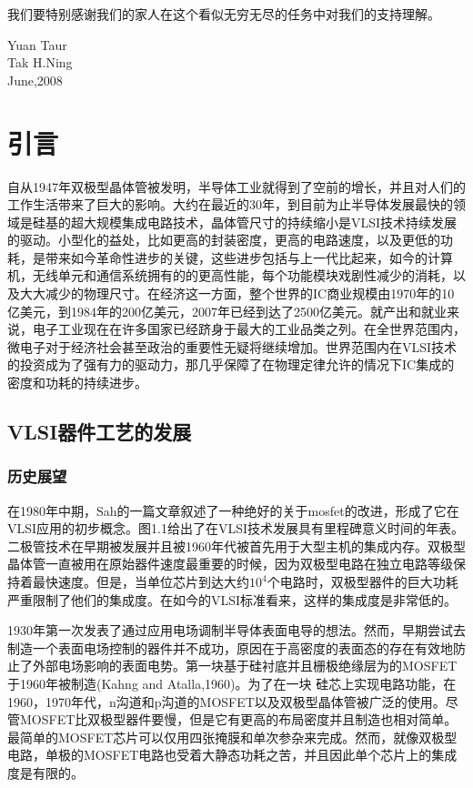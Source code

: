 \documentclass[cn,11pt,chinese]{elegantbook}
\begin{document}
我们要特别感谢我们的家人在这个看似无穷无尽的任务中对我们的支持理解。
\vskip 1.5cm

\begin{flushright}
	Yuan Taur\\
	Tak H.Ning\\
    June,2008
\end{flushright}

\tableofcontents
\mainmatter
\chapter{引言}
自从1947年双极型晶体管被发明，半导体工业就得到了空前的增长，并且对人们的工作生活带来了巨大的影响。大约在最近的30年，到目前为止半导体发展最快的领域是硅基的超大规模集成电路技术，晶体管尺寸的持续缩小是VLSI技术持续发展的驱动。小型化的益处，比如更高的封装密度，更高的电路速度，以及更低的功耗，是带来如今革命性进步的关键，这些进步包括与上一代比起来，如今的计算机，无线单元和通信系统拥有的的更高性能，每个功能模块戏剧性减少的消耗，以及大大减少的物理尺寸。在经济这一方面，整个世界的IC商业规模由1970年的10亿美元，到1984年的200亿美元，2007年已经到达了2500亿美元。就产出和就业来说，电子工业现在在许多国家已经跻身于最大的工业品类之列。在全世界范围内，微电子对于经济社会甚至政治的重要性无疑将继续增加。世界范围内在VLSI技术的投资成为了强有力的驱动力，那几乎保障了在物理定律允许的情况下IC集成的密度和功耗的持续进步。

\section{VLSI器件工艺的发展}
\subsection{历史展望}
在1980年中期，Sah的一篇文章叙述了一种绝好的关于mosfet的改进，形成了它在VLSI应用的初步概念。图1.1给出了在VLSI技术发展具有里程碑意义时间的年表。二极管技术在早期被发展并且被1960年代被首先用于大型主机的集成内存。双极型晶体管一直被用在原始器件速度最重要的时候，因为双极型电路在独立电路等级保持着最快速度。但是，当单位芯片到达大约$10^4$个电路时，双极型器件的巨大功耗严重限制了他们的集成度。在如今的VLSI标准看来，这样的集成度是非常低的。

1930年第一次发表了通过应用电场调制半导体表面电导的想法。然而，早期尝试去制造一个表面电场控制的器件并不成功，原因在于高密度的表面态的存在有效地防止了外部电场影响的表面电势。第一块基于硅衬底并且栅极绝缘层为的MOSFET于1960年被制造(Kahng and Atalla,1960)。为了在一块 硅芯上实现电路功能，在1960，1970年代，n沟道和p沟道的MOSFET以及双极型晶体管被广泛的使用。尽管MOSFET比双极型器件要慢，但是它有更高的布局密度并且制造也相对简单。最简单的MOSFET芯片可以仅用四张掩膜和单次参杂来完成。然而，就像双极型电路，单极的MOSFET电路也受着大静态功耗之苦，并且因此单个芯片上的集成度是有限的。
\end{document}
